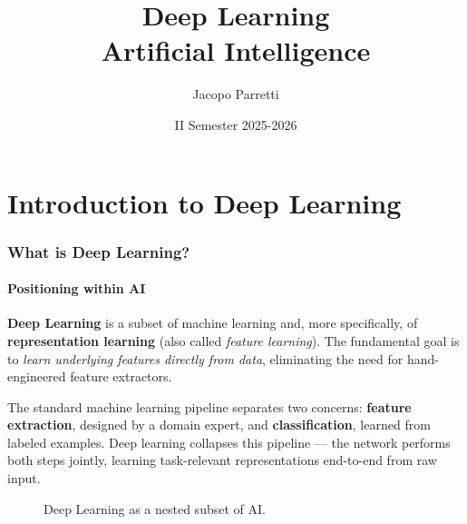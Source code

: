\documentclass[11pt,a4paper]{article}
\title{\textbf{Deep Learning}\\
\large Artificial Intelligence}
\author{Jacopo Parretti}
\date{II Semester 2025-2026}
\theoremstyle{definition}
\theoremstyle{plain}
\theoremstyle{remark}
\begin{document}
\maketitle
\tableofcontents
\newpage


\part{Introduction to Deep Learning}

\section{What is Deep Learning?}

\subsection{Positioning within AI}

\textbf{Deep Learning} is a subset of machine learning and, more specifically, of \textbf{representation learning} (also called \textit{feature learning}). The fundamental goal is to \emph{learn underlying features directly from data}, eliminating the need for hand-engineered feature extractors.

The standard machine learning pipeline separates two concerns: \textbf{feature extraction}, designed by a domain expert, and \textbf{classification}, learned from labeled examples. Deep learning collapses this pipeline --- the network performs both steps jointly, learning task-relevant representations end-to-end from raw input.

\begin{figure}[h]
    \centering
    \caption{Deep Learning as a nested subset of AI.}\label{fig:dl-subset}
\end{figure}
\end{document}

